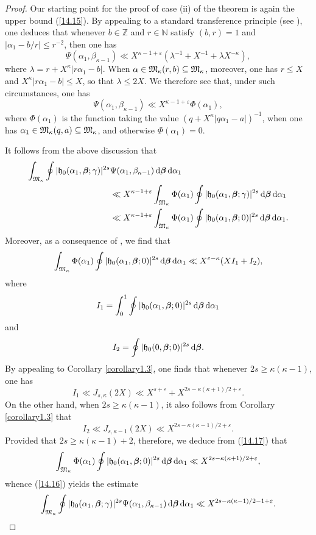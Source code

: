 \documentclass[12pt,reqno]{amsart}
\theoremstyle{definition}
\theoremstyle{remark}
\numberwithin{equation}{section}
\def\dbN{{\mathbb N}} \def\dbO{{\mathbb O}} \def\dbP{{\mathbb P}}
\def\dbZ{{\mathbb Z}}\def\dbQ{{\mathbb Q}}
\def\grh{{\mathfrak h}}\def\grH{{\mathfrak H}}
\def\alp{{\alpha}} \def\bfalp{{\boldsymbol \alpha}}
\def\bet{{\beta}}  \def\bfbet{{\boldsymbol \beta}}
\def\gam{{\gamma}} \def\Gam{{\Gamma}}
\def\kap{{\kappa}}
\def\lam{{\lambda}} \def\Lam{{\Lambda}} \def\Lamtil{{\widetilde \Lambda}}
\def\eps{\varepsilon}
\def\le{\leqslant} \def\ge{\geqslant} \def\pleq{\preccurlyeq} \def\ple{\prec}
\def\d{{\,{\rm d}}}
\begin{document}
\begin{proof}
Our starting point for the proof of case (ii) of the theorem is again the upper bound 
(\ref{14.15}). By appealing to a standard transference principle (see 
\cite[Lemma 14.1]{Woo2015b}), one deduces that whenever $b\in \dbZ$ and $r\in \dbN$ 
satisfy $(b,r)=1$ and $|\alp_1-b/r|\le r^{-2}$, then one has
$$\Psi(\alp_1,\bet_{\kap-1})\ll X^{\kap-1+\eps}(\lam^{-1}+X^{-1}+\lam X^{-\kap}),$$
where $\lam=r+X^\kap |r\alp_1-b|$. When $\alp\in \grM_\kap (r,b)\subseteq \grM_\kap$, 
moreover, one has $r\le X$ and $X^\kap |r\alp_1-b|\le X$, so that $\lam\le 2X$. We 
therefore see that, under such circumstances, one has
$$\Psi(\alp_1,\bet_{\kap-1})\ll X^{\kap-1+\eps}\Phi(\alp_1),$$
where $\Phi(\alp_1)$ is the function taking the value $(q+X^\kap |q\alp_1-a|)^{-1}$, 
when one has $\alp_1\in \grM_\kap(q,a)\subseteq \grM_\kap$, and otherwise 
$\Phi(\alp_1)=0$.\par

It follows from the above discussion that
\begin{align}
\int_{\grM_\kap}\oint |\grh_0(\alp_1,\bfbet;\gam)|^{2s}&\Psi(\alp_1,\bet_{\kap-1})
\d\bfbet \d\alp_1\notag \\
&\ll X^{\kap-1+\eps}\int_{\grM_\kap}\Phi(\alp_1)
\oint |\grh_0(\alp_1,\bfbet;\gam)|^{2s}\d\bfbet \d\alp_1\notag \\
&\ll X^{\kap-1+\eps}\int_{\grM_\kap}\Phi(\alp_1)
\oint |\grh_0(\alp_1,\bfbet;0)|^{2s}\d\bfbet \d\alp_1.\label{14.16}
\end{align}
Moreover, as a consequence of \cite[Lemma 2]{Bru1988}, we find that
\begin{equation}\label{14.17}
\int_{\grM_\kap} \Phi(\alp_1)\oint |\grh_0(\alp_1,\bfbet;0)|^{2s}\d\bfbet \d\alp_1 \ll 
X^{\eps-\kap}(XI_1+I_2),
\end{equation}
where
$$I_1=\int_0^1\oint |\grh_0(\alp_1,\bfbet;0)|^{2s}\d\bfbet \d\alp_1$$
and
$$I_2=\oint |\grh_0(0,\bfbet;0)|^{2s}\d\bfbet .$$
By appealing to Corollary \ref{corollary1.3}, one finds that whenever $2s\ge \kap(\kap-1)$, 
one has
$$I_1\ll J_{s,\kap}(2X)\ll X^{s+\eps}+X^{2s-\kap(\kap+1)/2+\eps}.$$
On the other hand, when $2s\ge \kap(\kap-1)$, it also follows from Corollary 
\ref{corollary1.3} that
$$I_2\ll J_{s,\kap-1}(2X)\ll X^{2s-\kap(\kap-1)/2+\eps}.$$
Provided that $2s\ge \kap(\kap-1)+2$, therefore, we deduce from (\ref{14.17}) that
$$\int_{\grM_\kap}\Phi(\alp_1)\oint |\grh_0(\alp_1,\bfbet;0)|^{2s}\d\bfbet \d\alp_1\ll 
X^{2s-\kap(\kap+1)/2+\eps},$$
whence (\ref{14.16}) yields the estimate
\begin{equation}\label{14.18}
\int_{\grM_\kap}\oint |\grh_0(\alp_1,\bfbet;\gam)|^{2s}\Psi(\alp_1,\bet_{\kap-1})
\d\bfbet \d\alp_1\ll X^{2s-\kap(\kap-1)/2-1+\eps}.
\end{equation}


\end{proof}
\end{document}
